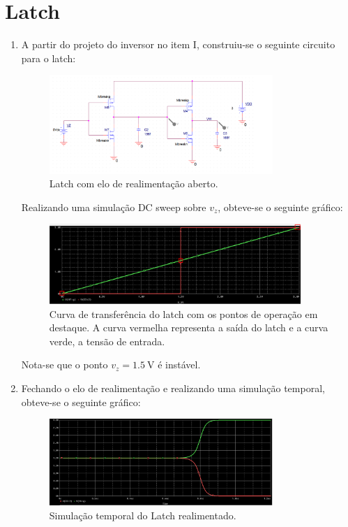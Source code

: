 \documentclass[11pt]{article}
\begin{document}
\newpage

\section{Latch}

\begin{enumerate}[label=\alph*)]

\item A partir do projeto do inversor no item I, construiu-se o seguinte circuito para o latch:

\begin{figure}
    \centering
    \includegraphics[width=0.8\textwidth]{imgs/latch_aberto.png}
    \caption{Latch com elo de realimentação aberto.}
    \label{fig:latch_aberto}
\end{figure}

Realizando uma simulação DC sweep sobre $v_z$, obteve-se o seguinte gráfico:

\begin{figure}
    \centering
    \includegraphics[width=0.9\textwidth]{imgs/transf_latch.png}
    \caption{Curva de transferência do latch com os pontos de operação em destaque. A curva vermelha representa a saída do latch e a curva verde, a tensão de entrada.}
    \label{fig:transf_latch}
\end{figure}

Nota-se que o ponto $v_z = 1.5\ \text{V}$ é instável.

\item Fechando o elo de realimentação e realizando uma simulação temporal, obteve-se o seguinte gráfico:

\begin{figure}
    \centering
    \includegraphics[width=0.8\textwidth]{imgs/latch_realimentado.png}
    \caption{Simulação temporal do Latch realimentado.}
    \label{fig:latch_realimentado}
\end{figure}


\end{enumerate}
\end{document}
